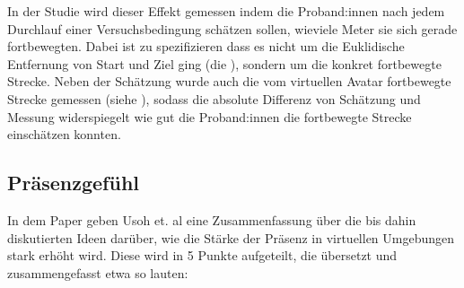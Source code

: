             In der Studie wird dieser Effekt gemessen indem die Proband:innen nach jedem Durchlauf einer Versuchsbedingung schätzen sollen, wieviele Meter sie sich gerade fortbewegten. Dabei ist zu spezifizieren dass es nicht um die Euklidische Entfernung von Start und Ziel ging (die ), sondern um die konkret fortbewegte Strecke.
            Neben der Schätzung wurde auch die vom virtuellen Avatar fortbewegte Strecke gemessen (siehe %
            ), sodass die absolute Differenz von Schätzung und Messung widerspiegelt wie gut die Proband:innen die fortbewegte Strecke einschätzen konnten.

        \subsection{Präsenzgefühl}
            In dem Paper \cite{presence-questionaire} geben Usoh et. al eine Zusammenfassung über die bis dahin diskutierten Ideen darüber, wie die Stärke der Präsenz in virtuellen Umgebungen stark erhöht wird. Diese wird in 5 Punkte aufgeteilt, die übersetzt und zusammengefasst etwa so lauten:

